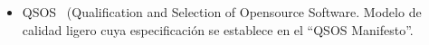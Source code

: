 \documentclass[11pt]{article}
\begin{document}
\begin{itemize}
\item{QSOS~\cite{qsos:qsos} (Qualification and Selection of Opensource Software}. Modelo de calidad ligero cuya especificación se establece en el ``QSOS Manifesto''. 
\end{itemize}
\end{document}
